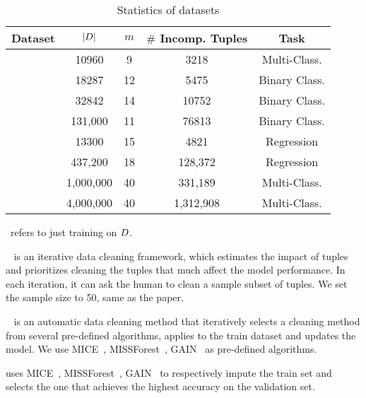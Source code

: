 \begin{table}
	\centering
	\caption{Statistics of datasets}
	\vspace{-1em}
	{\small
	\begin{tabular}{ccccc}
		\hline
		{\bf Dataset} & {\bf $|D|$} & {\bf $m$} & {\bf $\#$ Incomp. Tuples} & {\bf Task}\\
		\hline	
		\nursery & 	10960 & 9 & 3218 & Multi-Class. \\
		\hr & 18287 & 12 & 5475 & Binary Class. \\
		\adult & 32842 & 14 & 10752 & Binary Class. \\
		\credit & 131,000 & 11 & 76813 & Binary Class. \\
		\bike & 13300 & 15 & 4821 & Regression \\
		\air & 437,200  & 18 & 128,372 & Regression\\
		\imdb & 1,000,000 & 40 & 331,189 & Multi-Class.\\
		\imdbl & 4,000,000 & 40 & 1,312,908 & Multi-Class.\\
		\hline
	\end{tabular}
	}
	\label{tbl:dataset}
\end{table}

~refers to just training on $D$.

~\cite{DBLP:journals/pvldb/KrishnanWWFG16} is an iterative data cleaning framework, which estimates the impact of tuples  and prioritizes cleaning the tuples that much affect the model performance. In each iteration, it can ask the human to clean a sample subset of tuples. We set the sample size to 50, same as the paper. 

~\cite{DBLP:journals/corr/abs-1711-01299} is an automatic  data cleaning method that iteratively selects a cleaning method from several pre-defined algorithms, applies to the train dataset and  updates the model.  We use MICE~\cite{royston2011multiple}, MISSForest~\cite{DBLP:journals/bioinformatics/StekhovenB12}, GAIN~\cite{DBLP:conf/icml/YoonJS18} as pre-defined algorithms.


  uses MICE~\cite{royston2011multiple}, MISSForest~\cite{DBLP:journals/bioinformatics/StekhovenB12}, GAIN~\cite{DBLP:conf/icml/YoonJS18} to respectively impute the train set and selects the one that achieves the highest accuracy on the validation set.

